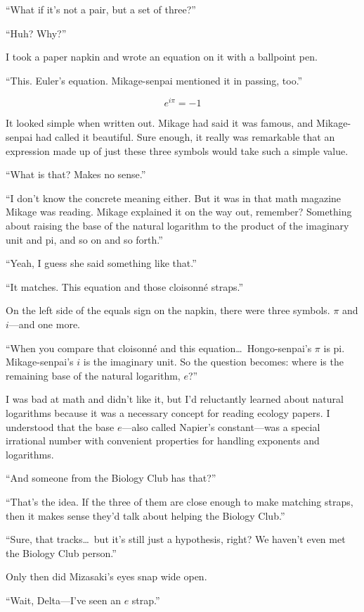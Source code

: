\documentclass[
    a4paper,
    12pt,
    twoside,
    openany,
    UTF8,
    fontset=windows
]{ctexbook}
\begin{document}
``What if it's not a pair, but a set of three?''

``Huh? Why?''

I took a paper napkin and wrote an equation on it with a ballpoint pen.

``This. Euler's equation. Mikage-senpai mentioned it in passing, too.''

\[
e^{i\pi} = -1
\]

It looked simple when written out. Mikage had said it was famous, and Mikage-senpai had called it beautiful. Sure enough, it really was remarkable that an expression made up of just these three symbols would take such a simple value.

``What is that? Makes no sense.''

``I don't know the concrete meaning either. But it was in that math magazine Mikage was reading. Mikage explained it on the way out, remember? Something about raising the base of the natural logarithm to the product of the imaginary unit and pi, and so on and so forth.''

``Yeah, I guess she said something like that.''

``It matches. This equation and those cloisonné straps.''

On the left side of the equals sign on the napkin, there were three symbols. $\pi$ and $i$---and one more.

``When you compare that cloisonné and this equation\dots\ Hongo-senpai's $\pi$ is pi. Mikage-senpai's $i$ is the imaginary unit. So the question becomes: where is the remaining base of the natural logarithm, $e$?''

I was bad at math and didn't like it, but I'd reluctantly learned about natural logarithms because it was a necessary concept for reading ecology papers. I understood that the base $e$---also called Napier's constant---was a special irrational number with convenient properties for handling exponents and logarithms.

``And someone from the Biology Club has that?''

``That's the idea. If the three of them are close enough to make matching straps, then it makes sense they'd talk about helping the Biology Club.''

``Sure, that tracks\dots\ but it's still just a hypothesis, right? We haven't even met the Biology Club person.''

Only then did Mizasaki's eyes snap wide open.

``Wait, Delta---I've seen an $e$ strap.''
\end{document}
